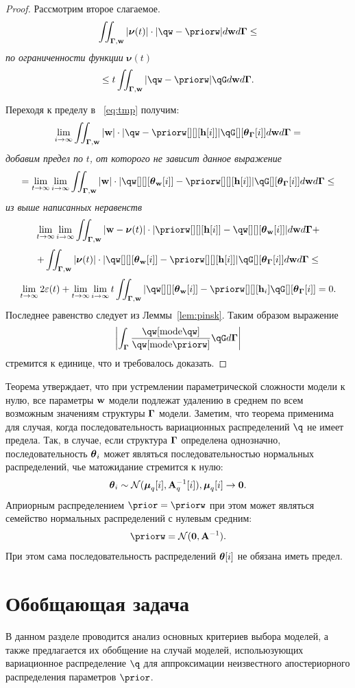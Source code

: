 \begin{proof}
Рассмотрим второе слагаемое.
$$
\iint_{\G,\w} |\boldsymbol{\nu}(t)|\cdot |\qw - \priorw| d\w d\G \leq 
$$
\textit{по ограниченности функции }$\boldsymbol{\nu}(t)$
$$
  \leq  t \iint_{\G,\w}  |\qw - \priorw|\qG d\w d\G.
$$

Переходя к пределу в ~\eqref{eq:tmp} получим:
$$
    \lim_{i \to \infty} \iint_{\G,\w} |\w| \cdot |\qw - \priorw[][][{\h[i]}]|\qG[][{\tetaG[i]}] d\w d\G  =
$$
\textit{добавим предел по }$t$\textit{, от которого не зависит данное выражение}
$$
= \lim_{t \to \infty}\lim_{i \to \infty}\iint_{\G,\w} |\w|\cdot |\qw[][][{\tetaw[i]}] - \priorw[][][{\h[i]}]|\qG[][{\tetaG[i]}] d\w d\G \leq
$$
\textit{из выше написанных неравенств}
$$
    \lim_{t \to \infty}\lim_{i \to \infty} \iint_{\G,\w} |\w -\boldsymbol{\nu}(t)|\cdot|\priorw[][][{\h[i]}] -\qw[][][{\tetaw[i]}]| d\w d\G   +
$$
$$
 + \iint_{\G,\w} |\boldsymbol{\nu}(t)| \cdot |\qw[][][{\tetaw[i]}] - \priorw[][][{\h[i]}]|\qG[][{\tetaG[i]}] d\w d\G \leq
$$
$$
     \lim_{t \to \infty}  2\varepsilon(t)  + \lim_{t \to \infty}\lim_{i \to \infty}  t \iint_{\G,\w}  |\qw[][][{\tetaw[i]}] - \priorw[][][\h_i]\qG[][{\tetaG[i]}] = 0.
$$
Последнее равенство следует из Леммы~\ref{lem:pinsk}.
Таким образом выражение $$\left|\int_{\G} \frac{\qw[\text{mode}\qw]}{\qw[\text{mode}\priorw]}\qG d\G \right|$$ стремится к единице, что и требовалось доказать.
\end{proof}

Теорема утверждает, что при устремлении параметрической сложности модели к нулю, все параметры $\mathbf{w}$  модели подлежат удалению в среднем по всем возможным значениям  структуры $\boldsymbol{\Gamma}$ модели. Заметим, что теорема применима для случая, когда последовательность вариационных распределений $\q$ не имеет предела. Так, в случае, если структура $\boldsymbol{\Gamma}$ определена однозначно, последовательность $\boldsymbol{\theta}_i$ может являться последовательностью нормальных распределений, чье матожидание стремится к нулю:
\[
    \boldsymbol{\theta}_i \sim \mathcal{N}(\boldsymbol{\mu}_q[i], \mathbf{A}^{-1}_q[i]), \boldsymbol{\mu}_q[i] \to \mathbf{0}.
\]
Априорным распределением $\prior = \priorw$ при этом может являться семейство нормальных распределений с нулевым средним:
\[
    \priorw = \mathcal{N}(\mathbf{0}, \A^{-1}).
\]
При этом сама последовательность распределений $\boldsymbol{\theta}[i]$ не обязана иметь предел.

\section{Обобщающая задача}
В данном разделе проводится анализ основных критериев выбора моделей, а также предлагается их обобщение на случай моделей, испольюзующих вариационное распределение $\q$ для аппроксимации неизвестного апостериорного распределения параметров $\prior$.

